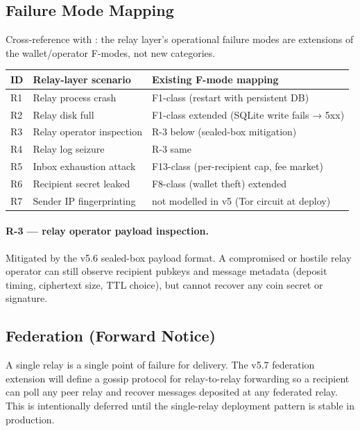 \subsection{Failure Mode Mapping}
\label{sec:relay-failure-modes}

Cross-reference with : the relay layer's
operational failure modes are extensions of the wallet/operator F-modes,
not new categories.

\begin{center}
\small
\begin{tabular}{@{}lll@{}}
\toprule
ID & Relay-layer scenario & Existing F-mode mapping \\
\midrule
R1 & Relay process crash       & F1-class (restart with persistent DB) \\
R2 & Relay disk full           & F1-class extended (SQLite write fails → 5xx) \\
R3 & Relay operator inspection & R-3 below (sealed-box mitigation) \\
R4 & Relay log seizure         & R-3 same                                \\
R5 & Inbox exhaustion attack   & F13-class (per-recipient cap, fee market) \\
R6 & Recipient secret leaked   & F8-class (wallet theft) extended         \\
R7 & Sender IP fingerprinting  & not modelled in v5 (Tor circuit at deploy) \\
\bottomrule
\end{tabular}
\end{center}

\paragraph{R-3 — relay operator payload inspection.} Mitigated by
the v5.6 sealed-box payload format. A compromised or hostile relay
operator can still observe recipient pubkeys and message metadata
(deposit timing, ciphertext size, TTL choice), but cannot recover
any coin secret or signature.

\subsection{Federation (Forward Notice)}
\label{sec:relay-federation}

A single relay is a single point of failure for delivery. The v5.7
federation extension will define a gossip protocol for relay-to-relay
forwarding so a recipient can poll any peer relay and recover messages
deposited at any federated relay. This is intentionally deferred until
the single-relay deployment pattern is stable in production.
